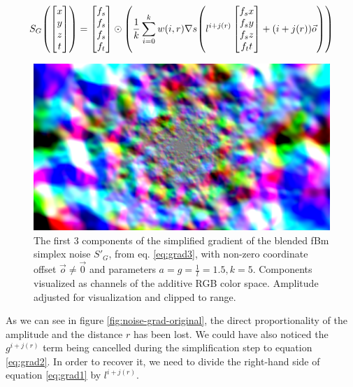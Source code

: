 \begin{equation}\label{eq:grad2}
    S_G\mleft(\begin{bmatrix}x\\y\\z\\t\end{bmatrix}\mright) = \begin{bmatrix}f_s\\f_s\\f_s\\f_t\end{bmatrix} \odot \mleft( \frac{1}{k} \sum_{i=0}^{k} w(i, r) \nabla s\mleft(l^{i+j(r)} \begin{bmatrix}f_sx\\f_sy\\f_sz\\f_tt\end{bmatrix} + (i + j(r)) \vec{o}\mright) \mright)
\end{equation}

\begin{figure}[H]
    \centering
    \ifgraphics
        \includegraphics[width=\linewidth]{img/noise-grad-modulated.png}%
    \fi
    \caption{The first 3 components of the simplified gradient of the blended \ac{fBm} simplex noise $S'_G$, from eq. \ref{eq:grad3}, with non-zero coordinate offset $\vec{o} \ne \vec{0}$ and parameters $a = g = \frac{1}{l} = 1.5, k = 5$. Components visualized as channels of the additive RGB color space. Amplitude adjusted for visualization and clipped to range.}
    \label{fig:noise-grad-modulated}
\end{figure}

As we can see in figure \ref{fig:noise-grad-original}, the direct proportionality of the amplitude and the distance $r$ has been lost. We could have also noticed the $g^{i+j(r)}$ term being cancelled during the simplification step to equation \ref{eq:grad2}. In order to recover it, we need to divide the right-hand side of equation \ref{eq:grad1} by $l^{i+j(r)}$.

